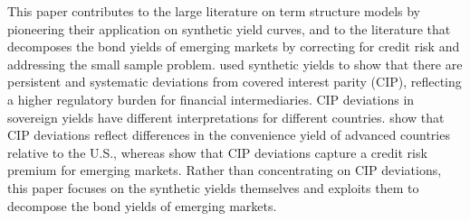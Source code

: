 {This paper contributes to the large literature on term structure models by pioneering their application on synthetic yield curves, and to the literature that decomposes the bond yields of emerging markets \citep*{BlakeRuleRummel:2015,ACDM:2019} by correcting for credit risk and addressing the small sample problem. 
\cite*{DuTepperVerdelhan:2018} used synthetic yields to show that there are persistent and systematic deviations from covered interest parity (CIP), reflecting a higher regulatory burden for financial intermediaries. 
CIP deviations in sovereign yields have different interpretations for different countries.
\cite*{DuImSchreger:2018JIE} show that CIP deviations reflect differences in the convenience yield of advanced countries relative to the U.S., whereas \cite{DuSchreger:2016JoF} show that CIP deviations capture a credit risk premium for emerging markets.
Rather than concentrating on CIP deviations, this paper focuses on the synthetic yields themselves and exploits them to decompose the bond yields of emerging markets.



}
